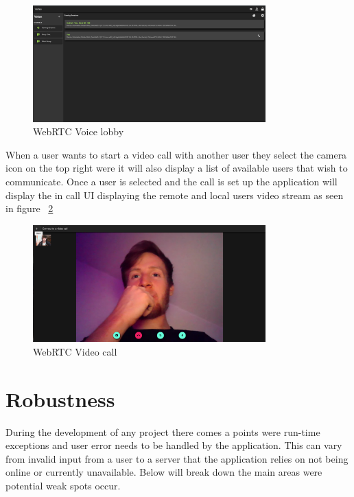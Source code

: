 \begin{figure}[h!]
    \caption{WebRTC Voice lobby}
    \label{image:voiceLobbyView}
    \centering
    \includegraphics[width=0.8\textwidth]{images/screenshotsOfPages/voiceCallLobby.png}
\end{figure}

When a user wants to start a video call with another user they select the camera icon on the top right were it will also display a list of available users that wish to communicate. Once a user is selected and the call is set up the application will display the in call UI displaying the remote and local users video stream as seen in figure ~\ref{image:videoCall}

\begin{figure}[h!]
    \caption{WebRTC Video call}
    \label{image:videoCall}
    \centering
    \includegraphics[width=0.8\textwidth]{images/screenshotsOfPages/webRTCProof2.png}
\end{figure}



\section{Robustness}
During the development of any project there comes a points were run-time exceptions and user error needs to be handled by the application. This can vary from invalid input from a user to a server that the application relies on not being online or currently unavailable. Below will break down the main areas were potential weak spots occur.

